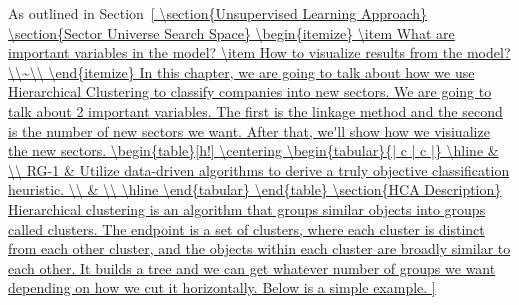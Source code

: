\documentclass[../main.tex]{subfiles}
\begin{document}
As outlined in Section~\ref{


\section{Unsupervised Learning Approach}

\section{Sector Universe Search Space}



\begin{itemize}
    \item What are important variables in the model?
    \item How to visualize results from the model?
    \\~\\
\end{itemize}

In this chapter, we are going to talk about how we use Hierarchical Clustering to classify companies into new sectors. We are going to talk about 2 important variables. The first is the linkage method and the second is the number of new sectors we want. After that, we'll show how we visiualize the new sectors.

\begin{table}[h!]
    \centering
    \begin{tabular}{| c | c |}
        \hline
        &  \\
        RG-1 & Utilize data-driven algorithms to derive a truly objective classification heuristic. \\
        & \\
        \hline
    \end{tabular}
\end{table}

\section{HCA Description}

Hierarchical clustering is an algorithm that groups similar objects into groups called clusters. The endpoint is a set of clusters, where each cluster is distinct from each other cluster, and the objects within each cluster are broadly similar to each other. It builds a tree and we can get whatever number of groups we want depending on how we cut it horizontally. Below is a simple example.

}
\end{document}
